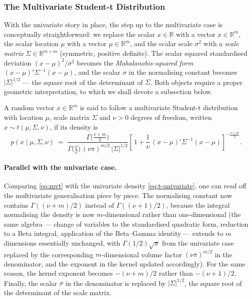 \documentclass[11pt, a4paper, oneside]{article}
\begin{document}
\newpage

\subsubsection{The Multivariate Student-t Distribution}
\label{subsec:mvt}

With the univariate story in place, the step up to the multivariate case
is conceptually straightforward: we replace the scalar $x \in \mathbb{R}$
with a vector $x \in \mathbb{R}^{m}$, the scalar location $\mu$ with a
vector $\mu \in \mathbb{R}^{m}$, and the scalar scale $\sigma^{2}$ with a
\emph{scale matrix} $\Sigma \in \mathbb{R}^{m \times m}$ (symmetric,
positive definite). The scalar squared standardised deviation
$(x - \mu)^{2}/\sigma^{2}$ becomes the \emph{Mahalanobis-squared form}
$(x - \mu)'\Sigma^{-1}(x - \mu)$, and the scalar $\sigma$ in the
normalising constant becomes $|\Sigma|^{1/2}$ — the square root of the
determinant of $\Sigma$. Both objects require a proper geometric
interpretation, to which we shall devote a subsection below.

A random vector $x \in \mathbb{R}^{m}$ is said to follow a multivariate
Student-t distribution with location $\mu$, scale matrix $\Sigma$ and
$\nu > 0$ degrees of freedom, written $x \sim t(\mu, \Sigma, \nu)$, if
its density is
\begin{equation}
p(x \mid \mu, \Sigma, \nu) \;=\;
\frac{\Gamma\!\big(\tfrac{\nu + m}{2}\big)}
     {\Gamma\!\big(\tfrac{\nu}{2}\big)\,(\nu\pi)^{m/2}\,|\Sigma|^{1/2}}
\left[\,1 + \frac{1}{\nu}\,(x-\mu)'\Sigma^{-1}(x-\mu)\right]^{-\tfrac{\nu + m}{2}}.
\label{eq:mvt}
\end{equation}

\paragraph{Parallel with the univariate case.}
Comparing \eqref{eq:mvt} with the univariate density
\eqref{eq:t-univariate}, one can read off the multivariate generalisation
piece by piece. The normalising constant now contains
$\Gamma((\nu+m)/2)$ instead of $\Gamma((\nu+1)/2)$, because the
integral normalising the density is now $m$-dimensional rather than
one-dimensional (the same algebra — change of variables to the standardised quadratic
form, reduction to a Beta integral, application of the Beta–Gamma
identity — extends to $m$ dimensions essentially unchanged, with
$\Gamma(1/2)\sqrt{\pi}$ from the univariate case replaced by the
corresponding $m$-dimensional volume factor $(\nu\pi)^{m/2}$ in the
denominator, and the exponent in the kernel updated accordingly). For the same reason, the kernel exponent becomes
$-(\nu + m)/2$ rather than $-(\nu + 1)/2$. Finally, the scalar $\sigma$
in the denominator is replaced by $|\Sigma|^{1/2}$, the square root of
the determinant of the scale matrix.
\end{document}
